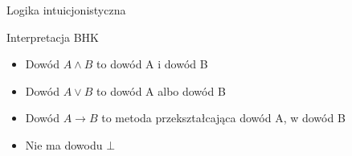 \documentclass{beamer}
\newcommand{\imp}{\rightarrow}
\begin{document}
\begin{frame}{Logika intuicjonistyczna}

    \pause
    
    \begin{block}{Interpretacja BHK}
        \begin{itemize}[<+->]
            \item Dowód $ A \land B $ to dowód A i dowód B
            \item Dowód $ A \lor B $ to dowód A albo dowód B
            \item Dowód $ A \imp B $ to metoda przekształcająca dowód A, w dowód B
            \item Nie ma dowodu $\bot$
        \end{itemize}
    \end{block}
\end{frame}
\end{document}
